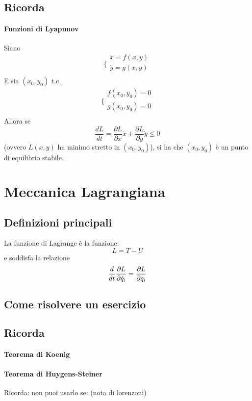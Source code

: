 \documentclass[a4paper,12pt]{article}
\begin{document}
\subsection{Ricorda}

\paragraph{Funzioni di Lyapunov}
Siano
$$\bigg\{ \begin{array}{l}
\dot{x} = f(x,y)\\
\dot{y} = g(x,y)\\
\end{array}$$
E sia $(x_0, y_0)$ t.c.
$$\bigg\{ \begin{array}{l}
f(x_0,y_0) = 0\\
g(x_0,y_0) = 0\\
\end{array}$$
Allora se
$$ \dfrac{dL}{dt} = \dfrac{\partial L}{\partial x}\dot{x} + \dfrac{\partial L}{\partial y}\dot{y} \leq 0 $$
(ovvero $L(x, y)$ ha minimo stretto in $(x_0, y_0)$), si ha che $(x_0,y_0)$ è un punto di equilibrio stabile.


\section{Meccanica Lagrangiana}
\subsection{Definizioni principali}
La funzione di Lagrange è la funzione:
$$ L = T - U $$
e soddisfa la relazione
$${d \over dt}\dfrac{\partial L}{\partial\dot{q}_i} = \dfrac{\partial L}{\partial q_i}$$
\subsection{Come risolvere un esercizio}

\subsection{Ricorda}
\paragraph{Teorema di Koenig}

\paragraph{Teorema di Huygens-Steiner}
Ricorda: non puoi usarlo se: (nota di lorenzoni)
\end{document}
